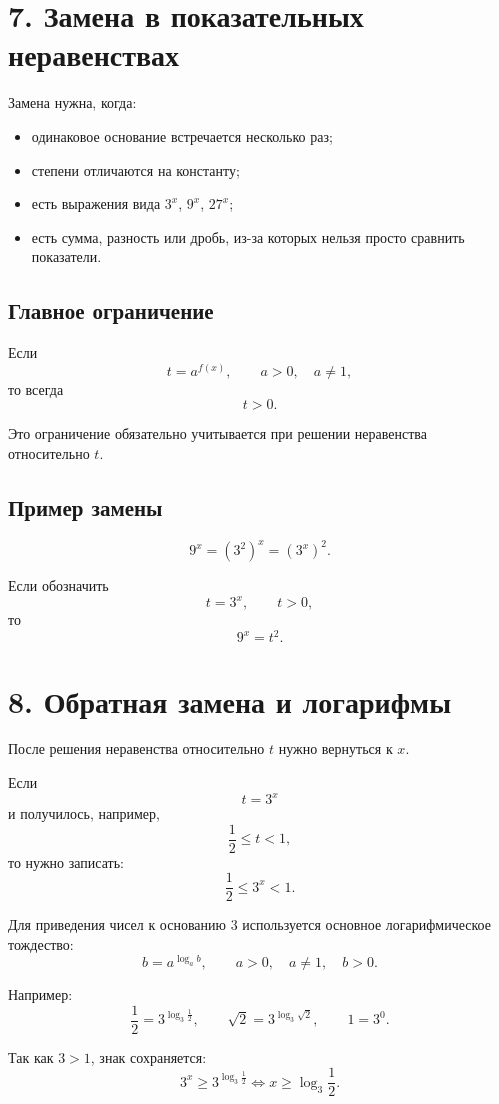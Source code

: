 \documentclass[a4paper,12pt]{article}
\newcommand{\sectionline}{\vspace{2mm}{\color{accent}\hrule height 0.6pt}\vspace{2mm}}
\begin{document}
\section*{7. Замена в показательных неравенствах}
\sectionline

Замена нужна, когда:
\begin{itemize}
    \item одинаковое основание встречается несколько раз;
    \item степени отличаются на константу;
    \item есть выражения вида \(3^x\), \(9^x\), \(27^x\);
    \item есть сумма, разность или дробь, из-за которых нельзя просто сравнить показатели.
\end{itemize}

\subsection*{Главное ограничение}

Если
\[
t=a^{f(x)},\qquad a>0,\quad a\ne 1,
\]
то всегда
\[
t>0.
\]

Это ограничение обязательно учитывается при решении неравенства относительно \(t\).

\subsection*{Пример замены}

\[
9^x=(3^2)^x=(3^x)^2.
\]

Если обозначить
\[
t=3^x,\qquad t>0,
\]
то
\[
9^x=t^2.
\]

\section*{8. Обратная замена и логарифмы}
\sectionline

После решения неравенства относительно \(t\) нужно вернуться к \(x\).

Если
\[
t=3^x
\]
и получилось, например,
\[
\frac12\le t<1,
\]
то нужно записать:
\[
\frac12\le 3^x<1.
\]

Для приведения чисел к основанию \(3\) используется основное логарифмическое тождество:
\[
b=a^{\log_a b},\qquad a>0,\quad a\ne 1,\quad b>0.
\]

Например:
\[
\frac12=3^{\log_3\frac12},\qquad
\sqrt2=3^{\log_3\sqrt2},\qquad
1=3^0.
\]

Так как \(3>1\), знак сохраняется:
\[
3^x\ge 3^{\log_3\frac12}
\Longleftrightarrow
x\ge \log_3\frac12.
\]
\end{document}
